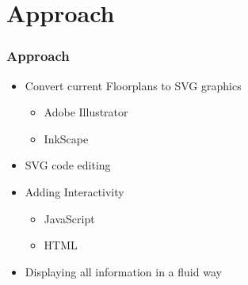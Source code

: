 \documentclass[hyperref={pdfpagelabels=false}]{beamer}
\begin{document}
\section{Approach} 
\hypertarget{Approach}{{}}
\begin{frame}
\frametitle{Approach}
\begin{itemize}[<+->]
	\item Convert current Floorplans to SVG graphics
	\begin{itemize}
		\item Adobe Illustrator
		\item InkScape
	\end{itemize}
		\item SVG code editing
		\item Adding Interactivity
	\begin{itemize}
		\item JavaScript
		\item HTML
	\end{itemize}
	\item Displaying all information in a fluid way
\end{itemize}
\end{frame}
\end{document}
